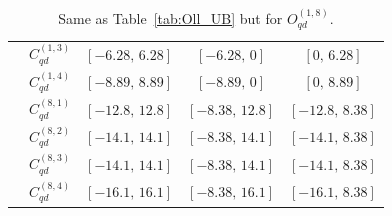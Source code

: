 \begin{table}[tbp]
{\begin{tabular}{ccccc}
        & $C_{qd}^{(1,3)}$ & $[-6.28,\, 6.28]$ & $[-6.28,\, 0]$    & $[0,\, 6.28]$    \\
        & $C_{qd}^{(1,4)}$ & $[-8.89,\, 8.89]$ & $[-8.89,\, 0]$    & $[0,\, 8.89]$    \\
        & $C_{qd}^{(8,1)}$ & $[-12.8,\, 12.8]$ & $[-8.38,\, 12.8]$ & $[-12.8,\, 8.38]$ \\
        & $C_{qd}^{(8,2)}$ & $[-14.1,\, 14.1]$ & $[-8.38,\, 14.1]$ & $[-14.1,\, 8.38]$ \\
        & $C_{qd}^{(8,3)}$ & $[-14.1,\, 14.1]$ & $[-8.38,\, 14.1]$ & $[-14.1,\, 8.38]$ \\
        & $C_{qd}^{(8,4)}$ & $[-16.1,\, 16.1]$ & $[-8.38,\, 16.1]$ & $[-16.1,\, 8.38]$ \\
    \bottomrule
\end{tabular}}
\caption{Same as Table~\ref{tab:Oll_UB} but for $O_{qd}^{(1,8)}$.}
\label{tab:Oqd_UB}
\end{table}
